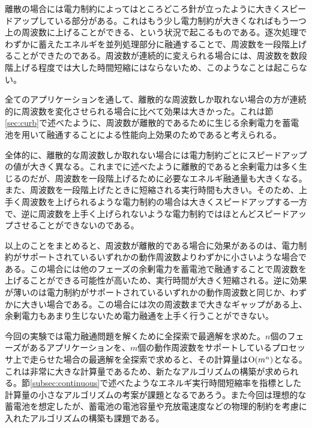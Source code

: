 離散の場合には電力制約によってはところどころ針が立ったように大きくスピードアップしている部分がある。これはもう少し電力制約が大きくなればもう一つ上の周波数に上げることができる、という状況で起こるものである。逐次処理でわずかに蓄えたエネルギを並列処理部分に融通することで、周波数を一段階上げることができたのである。周波数が連続的に変えられる場合には、周波数を数段階上げる程度では大した時間短縮にはならないため、このようなことは起こらない。

全てのアプリケーションを通して、離散的な周波数しか取れない場合の方が連続的に周波数を変化させられる場合に比べて効果は大きかった。これは節\ref{sec:curb}で述べたように、周波数が離散的であるために生じる余剰電力を蓄電池を用いて融通することによる性能向上効果のためであると考えられる。

全体的に、離散的な周波数しか取れない場合には電力制約ごとにスピードアップの値が大きく異なる。これまでに述べたように離散的であると余剰電力は多く生じるのだが、周波数を一段階上げるために必要なエネルギ融通量も大きくなる。また、周波数を一段階上げたときに短縮される実行時間も大きい。そのため、上手く周波数を上げられるような電力制約の場合は大きくスピードアップする一方で、逆に周波数を上手く上げられないような電力制約ではほとんどスピードアップさせることができないのである。

以上のことをまとめると、周波数が離散的である場合に効果があるのは、電力制約がサポートされているいずれかの動作周波数よりわずかに小さいような場合である。この場合には他のフェーズの余剰電力を蓄電池で融通することで周波数を上げることができる可能性が高いため、実行時間が大きく短縮される。逆に効果が薄いのは電力制約がサポートされているいずれかの動作周波数と同じか、わずかに大きい場合である。この場合には次の周波数まで大きなギャップがある上、余剰電力もあまり生じないため電力融通を上手く行うことができない。

今回の実験では電力融通問題を解くために全探索で最適解を求めた。$n$個のフェーズがあるアプリケーションを、$m$個の動作周波数をサポートしているプロセッサ上で走らせた場合の最適解を全探索で求めると、その計算量は${\rm O}(m^n)$となる。これは非常に大きな計算量であるため、新たなアルゴリズムの構築が求められる。節\ref{subsec:continuous}で述べたようなエネルギ実行時間短縮率を指標とした計算量の小さなアルゴリズムの考案が課題となるであろう。また今回は理想的な蓄電池を想定したが、蓄電池の電池容量や充放電速度などの物理的制約を考慮に入れたアルゴリズムの構築も課題である。










